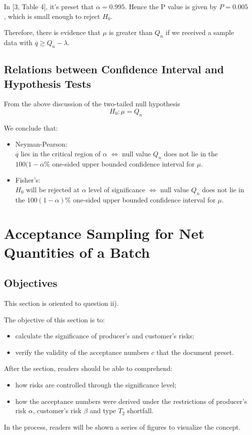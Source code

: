 \documentclass[a4paper]{article}
\begin{document}
In [3, Table 4], it's preset that $\alpha = 0.995$. Hence the P value is given by $P = 0.005$, which is small enough to reject $H_0$.

Therefore, there is evidence that $\mu$ is greater than $Q_n$ if we received a sample data with $\overline{q}\geq Q_n-\lambda$.

\newpage

\subsection{Relations between Confidence Interval and Hypothesis Tests}
From the above discussion of the two-tailed null hypothesis
$$H_0: \mu = Q_n$$

We conclude that:
\begin{itemize}
\item Neyman-Pearson: \\
$\overline{q}$ lies in the critical region of $\alpha$ $\Leftrightarrow$ null value $Q_n$ does not lie in the $100(1-\alpha\%$ one-sided upper bounded confidence interval for $\mu$.
\item Fisher's: \\
$H_0$ will be rejected at $\alpha$ level of significance $\Leftrightarrow$ null value $Q_n$ does not lie in the $100(1-\alpha)\%$ one-sided upper bounded confidence interval for $\mu$.
\end{itemize}

\section{Acceptance Sampling for Net Quantities of a Batch}
\subsection{Objectives}
This section is oriented to question ii).

The objective of this section is to:
\begin{itemize}
\item calculate the significance of producer's and customer's risks;
\item verify the validity of the acceptance numbers $c$ that the document preset.
\end{itemize} 

After the section, readers should be able to comprehend:
\begin{itemize}
\item how risks are controlled through the significance level;
\item how the acceptance numbers were derived under the restrictions of producer's risk $\alpha$, customer's risk $\beta$ and type $T_2$ shortfall.
\end{itemize} 
In the process, readers will be shown a series of figures to visualize the concept.
\end{document}
